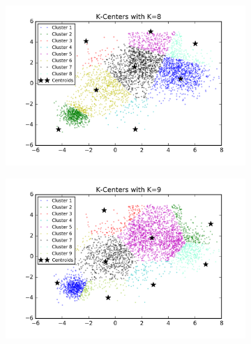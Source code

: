 \begin{description}
\begin{description}
\begin{figure}[!h]
\begin{subfigure}[b]{0.475\textwidth}
        \end{subfigure}
        \hfill
        \begin{subfigure}[b]{0.475\textwidth}  
            \centering 
            \includegraphics[width=\textwidth]{./figures/bigClustering_kCenter_8.png}
        \end{subfigure}
        \begin{subfigure}[b]{0.475\textwidth}   
            \centering 
            \includegraphics[width=\textwidth]{./figures/bigClustering_kCenter_9.png}
        \end{subfigure}
        \hfill
        \begin{subfigure}[b]{0.475\textwidth}   
            \centering 

\end{subfigure}
\end{figure}
\end{description}
\end{description}
